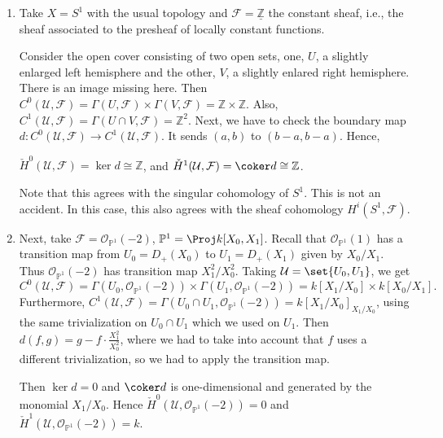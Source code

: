 \begin{enumerate}
	\item Take $X = S^1$ with the usual topology and $\mathcal{F} = \underline{\mathbb{Z}}$
		the constant sheaf, i.e., the sheaf associated to the presheaf of locally constant
		functions.

		Consider the open cover consisting of two open sets, one, $U$, a slightly enlarged left
		hemisphere and the other, $V$, a slightly enlared right hemisphere. There is an image missing
		here. Then $C^0(\mathcal{U}, \mathcal{F}) = \Gamma(U, \mathcal{F}) \times \Gamma(V, \mathcal{F}) = \mathbb{Z}\times \mathbb{Z}$.
		Also, $C^1(\mathcal{U}, \mathcal{F}) = \Gamma(U\cap V, \mathcal{F}) = \mathbb{Z}^2$.
		Next, we have to check the boundary map $d\colon C^0(\mathcal{U}, \mathcal{F}) \to C^1(\mathcal{U}, \mathcal{F})$.
		It sends $(a, b)$ to $(b-a, b-a)$. Hence,

		$\check{H}^0(\mathcal{U}, \mathcal{F}) = \ker d \cong \mathbb{Z}$, and
		$\check{H}^1(\mathcal{U}, \mathcal{F}) = \coker d\cong \mathbb{Z}$.

		Note that this agrees with the singular cohomology of $S^1$. This is not
		an accident. In this case, this also agrees with the sheaf cohomology
		$H^i(S^1, \mathcal{F})$.

	\item Next, take $\mathcal{F} = \mathcal{O}_{\mathbb{P}^1}(-2)$, $\mathbb{P}^1 =\Proj k[X_0, X_1]$.
		Recall that $\mathcal{O}_{\mathbb{P}^1}(1)$ has a transition map from
		$U_0 = D_+(X_0)$ to $U_1 = D_+(X_1)$ given by $X_0/X_1$.  Thus $\mathcal{O}_{\mathbb{P}^1}(-2)$
		has transition map $X_1^2/X_0^2$. Taking $\mathcal{U} = \set{U_0, U_1}$, we get
		\[ C^0(\mathcal{U}, \mathcal{F}) = \Gamma(U_0, \mathcal{O}_{\mathbb{P}^1}(-2))\times \Gamma(U_1, \mathcal{O}_{\mathbb{P}^1}(-2)) = k[X_1/X_0] \times k[X_0/X_1]. \]
		Furthermore, $C^1(\mathcal{U}, \mathcal{F}) = \Gamma(U_0\cap U_1, \mathcal{O}_{\mathbb{P}^1}(-2)) = k[X_1/X_0]_{X_1/X_0}$,
		using the same trivialization on $U_0\cap U_1$ which we used on $U_1$. Then
		$d(f, g) = g - f\cdot \frac{X_1^2}{X_0^2}$, where we had to take into account that $f$
		uses a different trivialization, so we had to apply the transition map.

		Then $\ker d = 0$ and $\coker d$ is one-dimensional and generated by
		the monomial $X_1/X_0$. Hence $\check{H}^0(\mathcal{U}, \mathcal{O}_{\mathbb{P}^1}(-2)) = 0$ and
		$\check{H}^1(\mathcal{U}, \mathcal{O}_{\mathbb{P}^1}(-2)) = k$.
\end{enumerate}
